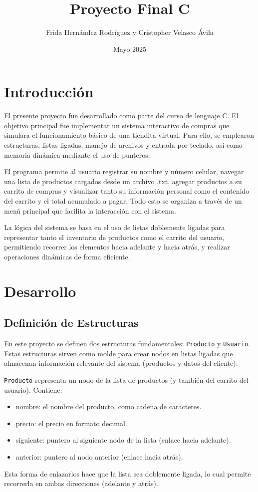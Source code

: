 \documentclass{article}
\title{Proyecto Final C}
\author{Frida Hernández Rodríguez y Cristopher Velasco Ávila}
\date{Mayo 2025}
\begin{document}
\maketitle
\pagebreak
\tableofcontents
\pagebreak
\section{Introducción}
El presente proyecto fue desarrollado como parte del curso de lenguaje C. El objetivo principal fue implementar un sistema interactivo de compras que simulara el funcionamiento básico de una tiendita virtual. Para ello, se emplearon estructuras, listas ligadas, manejo de archivos y entrada por teclado, así como memoria dinámica mediante el uso de punteros.

El programa permite al usuario registrar su nombre y número celular, navegar una lista de productos cargados desde un archivo .txt, agregar productos a su carrito de compras y visualizar tanto su información personal como el contenido del carrito y el total acumulado a pagar. Todo esto se organiza a través de un menú principal que facilita la interacción con el sistema.

La lógica del sistema se basa en el uso de listas doblemente ligadas para representar tanto el inventario de productos como el carrito del usuario, permitiendo recorrer los elementos hacia adelante y hacia atrás, y realizar operaciones dinámicas de forma eficiente.



\pagebreak
  \section{Desarrollo}
   \subsection{Definición de Estructuras}
   En este proyecto se definen dos estructuras fundamentales: \texttt{Producto} y \texttt{Usuario}. Estas estructuras sirven como molde para crear nodos en listas ligadas que almacenan información relevante del sistema (productos y datos del cliente).

   \texttt{Producto} representa un nodo de la lista de productos (y también del carrito del usuario). Contiene:
\begin{itemize}
    \item \textbf{} nombre: el nombre del producto, como cadena de caracteres.

\item \textbf{} precio: el precio en formato decimal.

\item \textbf{} siguiente: puntero al siguiente nodo de la lista (enlace hacia adelante).

\item \textbf{} anterior: puntero al nodo anterior (enlace hacia atrás).
\end{itemize}
Esta forma de enlazarlos hace que la lista sea doblemente ligada, lo cual permite recorrerla en ambas direcciones (adelante y atrás).
\end{document}
